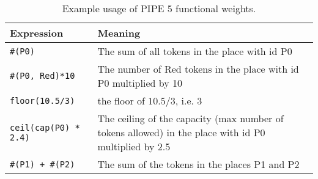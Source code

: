 
\begin{table}[tb]
\begin{center}
  \begin{tabular}{| l | p{10cm} |}
    \hline
    Expression & Meaning \\ 
    \hline
    \texttt{\#(P0)} & The sum of all tokens in the place with id P0 \\
    
    
    \hline
    \texttt{\#(P0, Red)*10} & The number of Red tokens in the place with id P0 multiplied by 10\\
    
    \hline
    \texttt{floor(10.5/3)} & the floor of $10.5/3$, i.e. $3$\\
    
    \hline
    \texttt{ceil(cap(P0) * 2.4)} & The ceiling of the capacity (max number of tokens allowed) in the place with id P0 multiplied by 2.5 \\


    \hline
    \texttt{\#(P1) + \#(P2)} & The sum of the tokens in the places P1 and P2 \\
    \hline

  \end{tabular}
\caption{Example usage of PIPE 5 functional weights.}
\label{tbl:functional_weights}
\end{center}
\end{table}
